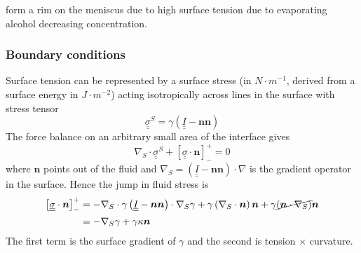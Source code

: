 \documentclass{jknotes}
\newcommand{\dunder}[1]{\underline{\underline{#1}}}
\begin{document}
\begin{itemize}
		form a rim on the meniscus due to high surface tension due to
		evaporating alcohol decreasing concentration.
		\begin{center}
		\end{center}
\end{itemize}

\subsubsection{Boundary conditions}
Surface tension can be represented by a surface stress (in $N \cdot m^{-1}$,
derived from a surface energy in $J \cdot m^{-2}$) acting isotropically across
lines in the surface with stress tensor
\begin{equation}
	\dunder{\sigma}^S = \gamma \left( \dunder{I} - \bm{n}\bm{n}\right)
\end{equation}
The force balance on an arbitrary small area of the interface gives
\begin{equation}
	\nabla_S \cdot \dunder{\sigma}^S + \left[ \dunder{\sigma} \cdot
	\bm{n}\right]^+_- = 0
\end{equation}
where $\bm{n}$ points out of the fluid and $\nabla_S = \left(\dunder{I} -
\bm{n}\bm{n}\right) \cdot \nabla$ is the gradient operator in the surface.
Hence the jump in fluid stress is
\begin{align}
	\left[ \dunder{\sigma} \cdot \bm{n}\right]^+_- &= -\nabla_S \cdot \gamma
	\left( \dunder{I} - \bm{n}\bm{n}\right) \cdot \nabla_S \gamma + \gamma
	\left( \nabla_S \cdot \bm{n}\right)\bm{n} + \gamma \cancel{(\bm{n}\cdot
	\nabla_S)} \bm{n}\\
	&= -\nabla_S \gamma + \gamma \kappa \bm{n}
\end{align}
The first term is the surface gradient of $\gamma$ and the second is tension
$\times$ curvature.
\end{document}
